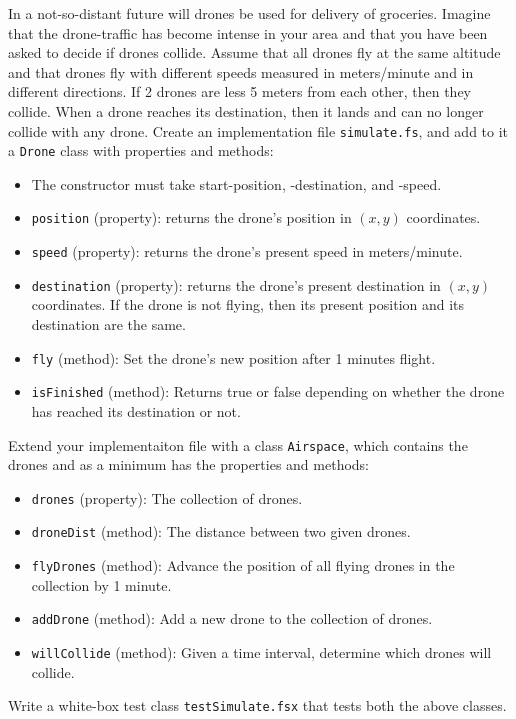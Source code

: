 In a not-so-distant future will drones be used for delivery of groceries. Imagine that the drone-traffic has become intense in your area and that you have been asked to decide if drones collide. Assume that all drones fly at the same altitude and that drones fly with different speeds measured in meters/minute and in different directions. If 2 drones are less 5 meters from each other, then they collide. When a drone reaches its destination, then it lands and can no longer collide with any drone. Create an implementation file \lstinline{simulate.fs}, and add to it a \lstinline{Drone} class with properties and methods:
\begin{itemize}
\item The constructor must take start-position, -destination, and -speed.
\item \lstinline{position} (property): returns the drone's position in $(x, y)$ coordinates.
\item \lstinline{speed} (property): returns the drone's present speed in meters/minute.
\item \lstinline{destination} (property): returns the drone's present destination in $(x, y)$ coordinates. If the drone is not flying, then its present position and its destination are the same.
\item \lstinline{fly} (method): Set the drone's new position after 1 minutes flight.
\item \lstinline{isFinished} (method): Returns true or false depending on whether the drone has reached its destination or not.
\end{itemize}

Extend your implementaiton file with a class \lstinline{Airspace}, which contains the drones and as a minimum has the properties and methods:
\begin{itemize}
\item \lstinline{drones} (property): The collection of drones.
\item \lstinline{droneDist} (method): The distance between two given drones.
\item \lstinline{flyDrones} (method): Advance the position of all flying drones in the collection by 1 minute.
\item \lstinline{addDrone} (method): Add a new drone to the collection of drones.
\item \lstinline{willCollide} (method): Given a time interval, determine which drones will collide.
\end{itemize}

Write a white-box test class \lstinline{testSimulate.fsx} that tests both the above classes.
